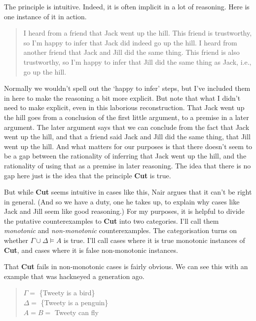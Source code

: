 \documentclass[11pt,]{book}
\begin{document}
The principle is intuitive. Indeed, it is often implicit in a lot of reasoning. Here is one instance of it in action.

\begin{quote}
I heard from a friend that Jack went up the hill. This friend is trustworthy, so I'm happy to infer that Jack did indeed go up the hill. I heard from another friend that Jack and Jill did the same thing. This friend is also trustworthy, so I'm happy to infer that Jill did the same thing as Jack, i.e., go up the hill.
\end{quote}

Normally we wouldn't spell out the `happy to infer' steps, but I've included them in here to make the reasoning a bit more explicit. But note that what I didn't need to make explicit, even in this laborious reconstruction. That Jack went up the hill goes from a conclusion of the first little argument, to a premise in a later argument. The later argument says that we can conclude from the fact that Jack went up the hill, and that a friend said Jack and Jill did the same thing, that Jill went up the hill. And what matters for our purposes is that there doesn't seem to be a gap between the rationality of inferring that Jack went up the hill, and the rationality of using that as a premise in later reasoning. The idea that there is no gap here just is the idea that the principle \textbf{Cut} is true.

But while \textbf{Cut} seems intuitive in cases like this, Nair argues that it can't be right in general. (And so we have a duty, one he takes up, to explain why cases like Jack and Jill seem like good reasoning.) For my purposes, it is helpful to divide the putative counterexamples to \textbf{Cut} into two categories. I'll call them \emph{monotonic} and \emph{non-monotonic} counterexamples. The categorisation turns on whether \(\Gamma \cup \Delta \vDash A\) is true. I'll call cases where it is true monotonic instances of \textbf{Cut}, and cases where it is false non-monotonic instances.

That \textbf{Cut} fails in non-monotonic cases is fairly obvious. We can see this with an example that was hackneyed a generation ago.

\begin{quote}
\(\Gamma =\) \{Tweety is a bird\}\\
\(\Delta =\) \{Tweety is a penguin\}\\
\(A = B =\) Tweety can fly
\end{quote}
\end{document}
